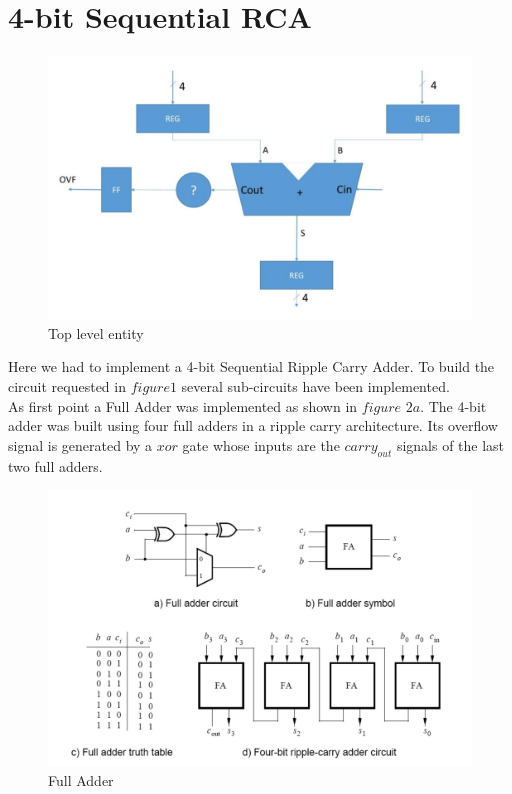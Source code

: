 \documentclass[12pt]{article}
\begin{document}

\section{4-bit Sequential RCA}

\begin{figure}[h]
	\centering
	\includegraphics[scale = 0.8]{immagini/B1.jpg}
	\caption{Top level entity}
\end{figure}


Here we had to implement a 4-bit Sequential Ripple Carry Adder. To build the circuit requested in $figure 1$ several sub-circuits have been implemented.\\
As first point a Full Adder was implemented as shown in $figure$ $2a$. The 4-bit adder was built using four full adders in a ripple carry architecture. Its overflow signal is generated by a $xor$ gate whose inputs are the $carry_{out}$ signals of the last two full adders.\\

\begin{figure}[h]
	\centering
	\includegraphics[scale = 0.4]{immagini/B2.jpg}
	\caption{Full Adder}
\end{figure}
\end{document}
